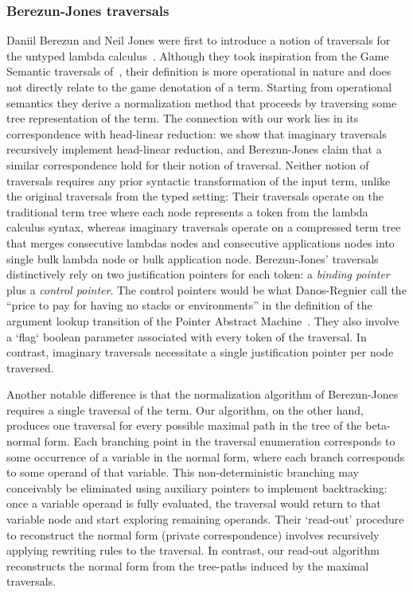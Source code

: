 \documentclass{elsarticle}
\theoremstyle{plain}
\theoremstyle{definition}
\begin{document}
\subsubsection{Berezun-Jones traversals}

Daniil Berezun and Neil Jones were first to introduce a notion of traversals for the untyped lambda calculus~\cite{JonesBerezunLLL-PEPM17}.
Although they took inspiration from the Game Semantic traversals of~\cite{OngLics2006,BlumGalop2008}, their definition is more operational in nature and does not directly relate to the game denotation of a term. Starting from operational semantics they derive a normalization method that proceeds by traversing some tree representation of the term.
%
The connection with our work lies in its correspondence with head-linear reduction: we show that imaginary traversals recursively implement head-linear reduction, and Berezun-Jones claim that a similar correspondence hold for their notion of traversal.
%
Neither notion of traversals requires any prior syntactic transformation of the input term, unlike the original traversals from the typed setting:
Their traversals operate on the traditional term tree where each node represents a token from the lambda calculus syntax,
whereas imaginary traversals operate on a compressed term tree that merges consecutive lambdas nodes and consecutive applications nodes into single bulk lambda node or bulk application node.
%
Berezun-Jones' traversals distinctively rely on two justification pointers for each token: a \emph{binding pointer} plus a \emph{control pointer}. The control pointers would be what Danos-Regnier call the ``price to pay for having no stacks or environments'' in the definition of the argument lookup transition of the Pointer Abstract Machine~\cite{danos-head}. They also involve a `flag` boolean parameter associated with every token of the traversal.
In contrast, imaginary traversals necessitate a single justification pointer per node traversed.

Another notable difference is that the normalization algorithm of Berezun-Jones requires a single traversal of the term. Our algorithm, on the other hand, produces one traversal for every possible maximal path in the tree of the beta-normal form. Each branching point in the traversal enumeration corresponds to some occurrence of a variable in the normal form, where each branch corresponds to some operand of that variable. This non-deterministic branching may conceivably be eliminated using auxiliary pointers to implement backtracking: once a variable operand is fully evaluated, the traversal would return to that variable node and start exploring remaining operands.
%
Their `read-out' procedure to reconstruct the normal form (private correspondence) involves recursively applying rewriting rules to the traversal. In contrast, our read-out algorithm reconstructs the normal form from the tree-paths induced by the maximal traversals.
\end{document}
